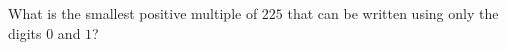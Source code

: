 What is the smallest positive multiple of $225$ that can be written using only the digits $0$ and $1$?
